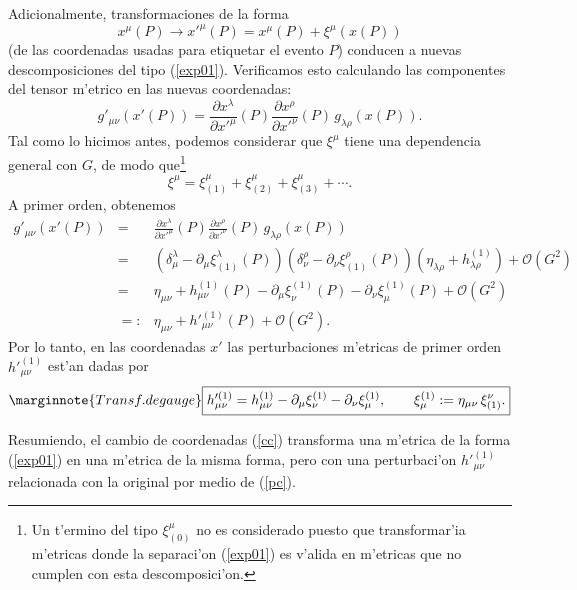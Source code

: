  Adicionalmente, transformaciones de la forma
\begin{equation}\label{cc}
x^\mu(P) \rightarrow x'^\mu(P)=x^\mu(P) + \xi^\mu(x(P))
\end{equation}
(de las coordenadas usadas para etiquetar el evento $P$) conducen a nuevas descomposiciones del tipo (\ref{exp01}). Verificamos esto calculando las componentes del tensor m'etrico en las nuevas coordenadas:
\begin{equation}
g'_{\mu\nu}(x' (P)) = \frac{\partial x^\lambda}{\partial
x'^\mu}(P) \frac{\partial x^\rho}{\partial x'^\nu}(P)\, g_{\lambda\rho}(x(P)).
\end{equation}
Tal como lo hicimos antes, podemos considerar que $\xi^\mu$ tiene una dependencia general con $G$, de modo que\footnote{Un t'ermino del tipo $\xi^\mu_{(0)}$ no es considerado puesto que transformar'ia m'etricas donde la separaci'on (\ref{exp01}) es v'alida en m'etricas que no cumplen con esta descomposici'on. }
\begin{equation}
\xi^\mu=\xi^\mu_{(1)}+\xi^\mu_{(2)}+\xi^\mu_{(3)}+\cdots.
\end{equation}
A primer orden, obtenemos
\begin{eqnarray}
g'_{\mu\nu}(x' (P))&=&\frac{\partial x^\lambda}{\partial
x'^\mu}(P)
\frac{\partial x^\rho}{\partial x'^\nu}(P)\, g_{\lambda\rho}(x(P)) \\
&=&\left(\delta^\lambda_\mu - \partial_\mu\xi^\lambda_{(1)}(P)
\right)\left(\delta^\rho_\nu -
\partial_\nu\xi^\rho_{(1)}(P) \right) \left(\eta_{\lambda\rho} + h^{(1)}_{\lambda\rho}\right) +
\mathcal{O}(G^2) \\
&=& \eta_{\mu\nu} + h^{(1)}_{\mu\nu}(P)- \partial_\mu\xi_\nu^{(1)}(P) - \partial_\nu
\xi_\mu^{(1)}(P)
+ \mathcal{O}(G^2) \\
&=:& \eta_{\mu\nu} + h'^{(1)}_{\mu\nu}(P)+ \mathcal{O}(G^2) .
\end{eqnarray}
Por lo tanto, en las coordenadas $x'$ las perturbaciones m'etricas de primer orden $h'^{(1)}_{\mu\nu}$ est'an dadas por
\begin{equation}\label{pc}\marginnote{Transf. de gauge}
\boxed{h'^{(1)}_{\mu\nu}=h^{(1)}_{\mu\nu}- \partial_\mu\xi_\nu^{(1)} - \partial_\nu\xi_\mu^{(1)} , \qquad \xi_\mu^{(1)}:=\eta_{\mu\nu}\, \xi^\nu_{(1)} .}
\end{equation}

Resumiendo, el cambio de coordenadas (\ref{cc}) transforma una m'etrica de la forma (\ref{exp01}) en una m'etrica de la misma forma, pero con una perturbaci'on $h'^{(1)}_{\mu\nu}$ relacionada con la original por medio de (\ref{pc}).


